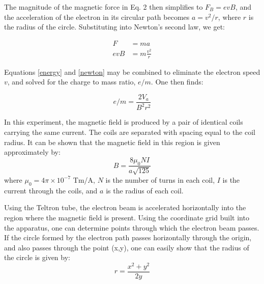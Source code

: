 \documentclass{tufte-handout}
\begin{document}
The magnitude of the magnetic force in Eq. 2 then simplifies to
$F_{B }= evB$, and the acceleration of the electron in its
circular path becomes $a = v^{2}/r$, where $r$ is the radius
of the circle. Substituting into Newton's second law,
we get:


\begin{align}
\label{newton}
F &= ma \nonumber \\
evB &= m\frac{v^{2}}{r}
\end{align}

Equations \ref{energy} and \ref{newton} may be combined to eliminate the electron speed $v$, and
solved for the charge to mass ratio, $e/m$. One then finds:

\begin{equation}
\label{eom}
\boxed{ e/m = \frac{2V_a}{B^2r^2} }
\end{equation}

In this experiment, the magnetic field is produced by a pair of identical coils
carrying the same current. The coils are separated with spacing equal to the
coil radius. It can be shown that the
magnetic field in this region is given approximately by:
\begin{equation}
\label{helmholtz}
\boxed{ B=\frac{8 \mu_0 N I}{a \sqrt{125}} }
\end{equation}
\noindent where $\mu_0 = 4\pi \times 10^{-7} $ Tm/A, $N$ is the number of turns
in each coil, $I$ is the current through the coils, and $a$ is the radius of
each coil.

Using the Teltron tube, the electron beam is accelerated horizontally into the
region where the magnetic field is present. Using the coordinate grid built into
the apparatus, one can determine points through which the electron beam
passes. If the circle formed by the electron path passes horizontally through
the origin, and also passes through the point (x,y), one can easily show that
the radius of the circle is given by:
\begin{equation}
\label{circle}
\boxed{ r=\frac{x^2+y^2}{2y} }
\end{equation}
\end{document}
